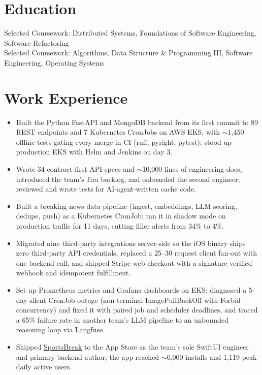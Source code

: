 \documentclass[11pt, letterpaper]{article}
\begin{document}

\section{Education}
Selected Coursework: Distributed Systems, Foundations of Software Engineering, Software Refactoring\\[1pt]
Selected Coursework: Algorithms, Data Structure \& Programming III, Software Engineering, Operating Systems

\section{Work Experience}
\begin{itemize}
  \item Built the Python FastAPI and MongoDB backend from its first commit to 89 REST endpoints and 7 Kubernetes CronJobs on AWS EKS, with $\sim$1{,}450 offline tests gating every merge in CI (ruff, pyright, pytest); stood up production EKS with Helm and Jenkins on day 3.
  \item Wrote 34 contract-first API specs and $\sim$10{,}000 lines of engineering docs, introduced the team's Jira backlog, and onboarded the second engineer; reviewed and wrote tests for AI-agent-written cache code.
  \item Built a breaking-news data pipeline (ingest, embeddings, LLM scoring, dedupe, push) as a Kubernetes CronJob; ran it in shadow mode on production traffic for 11 days, cutting filler alerts from 34\% to 4\%.
  \item Migrated nine third-party integrations server-side so the iOS binary ships zero third-party API credentials, replaced a 25--30 request client fan-out with one backend call, and shipped Stripe web checkout with a signature-verified webhook and idempotent fulfillment.
  \item Set up Prometheus metrics and Grafana dashboards on EKS; diagnosed a 5-day silent CronJob outage (non-terminal ImagePullBackOff with Forbid concurrency) and fixed it with paired job and scheduler deadlines, and traced a 65\% failure rate in another team's LLM pipeline to an unbounded reasoning loop via Langfuse.
  \item Shipped \href{https://apps.apple.com/app/id6762649287}{SportsBreak} to the App Store as the team's sole SwiftUI engineer and primary backend author; the app reached $\sim$6{,}000 installs and 1{,}119 peak daily active users.
\end{itemize}
\end{document}
